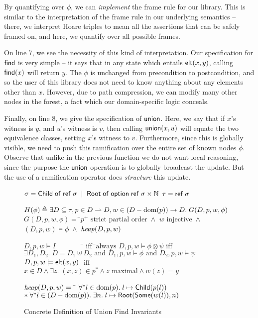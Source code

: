By quantifying over $\phi$, we can \emph{implement} the frame rule for
our library. This is similar to the interpretation of the frame rule
in our underlying semantics -- there, we interpret Hoare triples to mean all
the assertions that can be safely framed on, and here, we quantify over
all possible frames. 

On line 7, we see the necessity of this kind of interpretation. Our
specification for $\mathsf{find}$ is very simple -- it says that in any state
which entails $\mathsf{elt}({x}, {y})$, calling $\mathsf{find}(x)$ will return $y$. The
$\phi$ is unchanged from precondition to postcondition, and so the
user of this library does not need to know anything about any elements
other than $x$. However, due to path compression, we can modify 
many other nodes in the forest, a fact which our domain-specific
logic conceals. 

Finally, on line 8, we give the specification of $\mathsf{union}$. Here, 
we say that if $x$'s witness is $y$, and $u$'s witness is $v$, then 
calling $\mathsf{union}(x,u)$ will equate the two equivalence classes, setting
$x$'s witness to $v$. Furthermore, since this is globally visible, we
need to push this ramification over the entire set of known 
nodes $\phi$. Observe that unlike in the previous function we do not
want local reasoning, since the purpose the $\mathsf{union}$ operation 
is to globally broadcast the update. But the use of a ramification
operator does \emph{structure} this update. 


\begin{figure}
\mbox{}
\begin{specification}
\nextline $\sigma = \mathsf{Child} \;\mathsf{of}\; \mathsf{ref}\;\sigma \;\;|\;\; \mathsf{Root} \;\mathsf{of}\; \mathsf{option }{\;}{\mathsf{ref}\;\sigma} \times \mathbb{N}$ 
\nextline $\tau = \mathsf{ref}\;\sigma$ 

   $H(\phi) \triangleq \exists D \subseteq \tau, p \in D \rightharpoonup D, w \in (D-\mbox{dom}({p})) \to D.\;G(D,p,w,\phi)$
\nextline[1em] $G(D, p, w, \phi) =\;$\=$p^{+} \mbox{ strict partial order} \;\land$ 
\nextline \> $w \mbox{ injective} \;\land$ 
\nextline \> $(D, p, w) \models \phi \;\land$
\nextline \> $\mathit{heap}(D, p, w)$ 

\nextline[1em] $D, p, w \models I \qquad\qquad$\=$\mbox{ iff}\;\;$\=$\mbox{always}$ 
\nextline      $D, p, w \models \phi \otimes \psi$\>$\mbox{ iff}$\>$
                     \exists D_1, D_2.\; D = D_1 \uplus D_2 \mbox{ and } D_1, p, w \models \phi \mbox{ and } 
                     D_2, p, w \models \psi$
\nextline      $D, p, w \models \mathsf{elt}({x}, {y})$ \> $\mbox{ iff }$\>$x \in D \land \exists z.\;(x,z) \in p^* \land z\mbox{ maximal} \land w(z) = y$

\nextline[1em] $\mathit{heap}(D, p, w) = \;\;$\=
    $\forall^{*} l \in \mbox{dom}({p}).\; l \mapsto \mathsf{Child}(p(l))$ 
\nextline\>  $* \; \forall^{*} l \in (D - \mbox{dom}({p})).\; \exists n.\;l \mapsto \mathsf{Root}(\mathsf{Some}(w(l)), n)$ 
\end{specification}
\caption{Concrete Definition of Union Find Invariants}
\label{union-find:invariant}
\end{figure}
 

